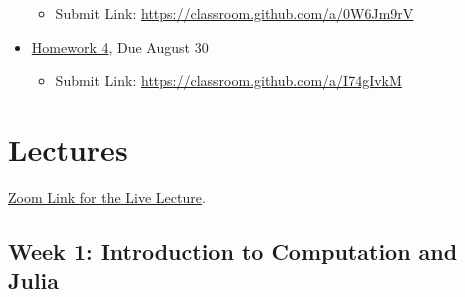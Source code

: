 \documentclass[
]{book}
\providecommand{\tightlist}{%
  \setlength{\itemsep}{0pt}\setlength{\parskip}{0pt}}
\begin{document}
\begin{itemize}
  \begin{itemize}
  \tightlist
  \item
    Submit Link: \url{https://classroom.github.com/a/0W6Jm9rV}
  \end{itemize}
\item
  \href{https://kevinghunt.github.io/ComputationCamp/homeworks/homework4.html}{Homework 4}, Due August 30

  \begin{itemize}
  \tightlist
  \item
    Submit Link: \url{https://classroom.github.com/a/I74gIvkM}
  \end{itemize}
\end{itemize}

\hypertarget{lectures}{%
\chapter{Lectures}\label{lectures}}

\href{https://uwmadison.zoom.us/j/93415370734?pwd=V1l1TmdmV2lYYUNkTk5rQmdiZU9Wdz09}{Zoom Link for the Live Lecture}.

\hypertarget{week-1-introduction-to-computation-and-julia-1}{%
\section{Week 1: Introduction to Computation and Julia}\label{week-1-introduction-to-computation-and-julia-1}}
\end{document}
